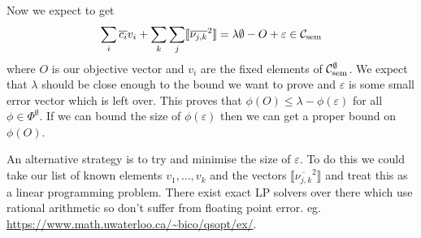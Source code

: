 Now we expect to get
\[
    \sum_i \overline{c_i} v_i + \sum_k \sum_j \llbracket \overline{\nu_{j,k}}^2 \rrbracket
    = \lambda\emptyset - O + \varepsilon
    \in \mathcal{C}_\mathrm{sem}
\]
where $O$ is our objective vector and $v_i$ are the fixed elements of
$\mathcal{C}_\mathrm{sem}^\emptyset$. We expect that $\lambda$ should be close enough to
the bound we want to prove and $\varepsilon$ is some small error vector which is
left over. This proves that $\phi(O) \leq \lambda - \phi(\varepsilon)$ for all
$\phi\in\Phi^\emptyset$. If we can bound the size of $\phi(\varepsilon)$ then we can
get a proper bound on $\phi(O)$.

An alternative strategy is to try and minimise the size of $\varepsilon$. To do this
we could take our list of known elements $v_1, \dots, v_k$ and the
vectors $\llbracket \overline{\nu_{j,k}}^2\rrbracket$ and treat this as
a linear programming problem. There exist exact LP solvers over there which
use rational arithmetic so don't suffer from floating point error.
eg. \url{https://www.math.uwaterloo.ca/~bico/qsopt/ex/}.
